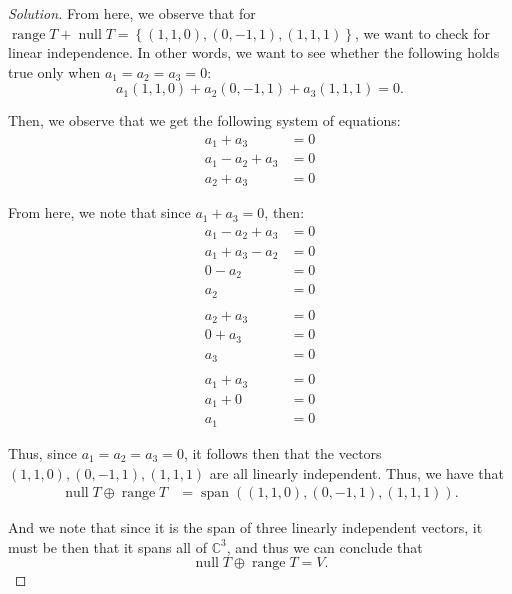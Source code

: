 \documentclass{article}
\newenvironment{solution}{\begin{proof}[Solution]}{\end{proof}}
\newcommand{\CC}{\mathbb{C}}
\DeclareMathOperator*{\vspan}{\mathrm{span}}
\DeclareMathOperator*{\vnull}{\mathrm{null}}
\DeclareMathOperator*{\vrange}{\mathrm{range}}
\begin{document}
\begin{solution}
		From here, we observe that for $\vrange T + \vnull T = \left\{  (1,1,0), (0,-1, 1), (1,1,1) \right\}$, we want to check for linear independence. In other words, we want to see whether the following holds true only when $a_{1} = a_{2} = a_{3} = 0$:
		\begin{equation*}
			a_{1}(1,1,0) + a_{2}(0,-1,1) +a_{3}(1,1,1) = 0.
		\end{equation*}
	
		Then, we observe that we get the following system of equations:
		\begin{align*}
			a_{1} + a_{3} &= 0 \\
			a_{1} - a_{2} + a_{3} &= 0 \\
			a_{2} + a_{3} &= 0
		\end{align*}
	
		From here, we note that since $a_{1} + a_{3} = 0$, then:
		\begin{align*}
			a_{1} - a_{2} + a_{3} &= 0 \\
			a_{1} + a_{3} - a_{2} &= 0\\
			0 - a_{2} &= 0 \\
			a_{2} &= 0 \\
			\\
			a_{2} + a_{3} &= 0 \\
			0 + a_{3} &= 0 \\
			a_{3} &= 0 \\
			\\
			a_{1} + a_{3} &= 0 \\
			a_{1} + 0 &= 0 \\
			a_{1} &= 0
		\end{align*}
	
		Thus, since $a_{1} = a_{2} = a_{3} = 0$, it follows then that the vectors $(1,1,0), (0,-1,1), (1,1,1)$ are all linearly independent. Thus, we have that
		\begin{align*}
			\vnull T \oplus \vrange T &= \vspan \left( (1,1,0), (0,-1,1), (1,1,1) \right).
		\end{align*}
		
		And we note that since it is the span of three linearly independent vectors, it must be then that it spans all of $\CC^{3}$, and thus we can conclude that
		\begin{equation*}
			\vnull T \oplus \vrange T = V.
		\end{equation*}
	\end{solution}

	\newpage
	
\end{document}
